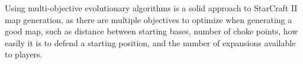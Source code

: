 Using multi-objective evolutionary algorithms is a solid approach to StarCraft II map generation, as there are multiple objectives to optimize when generating a good map, such as distance between starting bases, number of choke points, how easily it is to defend a starting position, and the number of expansions available to players.